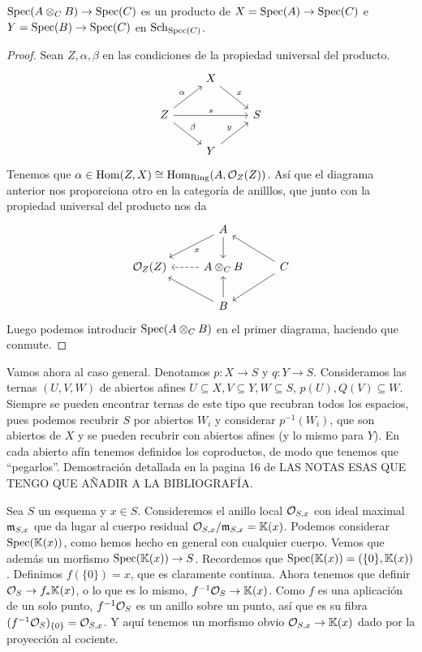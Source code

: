 \documentclass[GA.tex]{subfiles}
\begin{document}
\begin{dem}
\begin{lemma}
$\operatorname{Spec}(A\otimes_C B)\to\operatorname{Spec}(C)$ es un producto de $X=\operatorname{Spec}(A)\to\operatorname{Spec}(C)$ e $Y=\operatorname{Spec}(B)\to\operatorname{Spec}(C)$ en $\mathrm{Sch}_{\operatorname{Spec}(C)}$.
\end{lemma}
\begin{proof}
Sean $Z,\alpha,\beta$ en las condiciones de la propiedad universal del producto. 
\[
\begin{tikzcd}
& X\arrow[dr, "x"]&\\
Z\arrow[ur, "\alpha"]\arrow[rr, "s"]\arrow[dr, "\beta"] &  & S\\
& Y \arrow[ur, "y"]&
\end{tikzcd}
\]
Tenemos que $\alpha\in\operatorname{Hom}(Z,X)\cong\operatorname{Hom}_{\mathrm{Ring}}(A,{\mathcal O}_Z(Z))$. Así que el diagrama anterior nos proporciona otro en la categoría de anilllos, que junto con la propiedad universal del producto nos da
\[
\begin{tikzcd}
& A\arrow[dl, "x"]\arrow[d]&\\
\OO_Z(Z) & A\otimes_C B\arrow[l, dashed] & C\arrow[dl]\arrow[ul]\\
& B \arrow[ul]\arrow[u]&
\end{tikzcd}
\]
Luego podemos introducir $\operatorname{Spec}(A\otimes_C B)$ en el primer diagrama, haciendo que conmute. 

\end{proof}

Vamos ahora al caso general. Denotamos $p:X\to S$ y $q:Y\to S$. Consideramos las ternas $(U,V,W)$ de abiertos afines $U\subseteq X, V\subseteq Y, W\subseteq S$, $p(U),Q(V)\subseteq W$. Siempre se pueden encontrar ternas de este tipo que recubran todos los espacios, pues podemos recubrir $S$ por abiertos $W_i$ y considerar $p^{-1}(W_i)$, que son abiertos de $X$ y se pueden recubrir con abiertos afines (y lo mismo para $Y$). En cada abierto afín tenemos definidos los coproductos, de modo que tenemos que ``pegarlos''. Demostración detallada en la pagina 16 de LAS NOTAS ESAS QUE TENGO QUE AÑADIR A LA BIBLIOGRAFÍA. 
\end{dem}

Sea $S$ un esquema y $x\in S$. Consideremos el anillo local ${\mathcal O}_{S,x}$ con ideal maximal ${\mathfrak{m}}_{S,x}$ que da lugar al cuerpo residual ${\mathcal O}_{S,x}/{\mathfrak{m}}_{S,x}=\mathbb{K}(x)$. Podemos considerar $\operatorname{Spec}(\mathbb{K}(x))$, como hemos hecho en general con cualquier cuerpo. Vemos que además un morfismo $\operatorname{Spec}(\mathbb{K}(x))\to S$. Recordemos que $\operatorname{Spec}(\mathbb{K}(x))=(\{0\},\mathbb{K}(x))$. Definimos $f(\{0\})=x$, que es claramente continua. Ahora tenemos que definir ${\mathcal O}_S\to f_*\mathbb{K}(x)$, o lo que es lo mismo, $f^{-1}{\mathcal O}_S\to \mathbb{K}(x)$. Como $f$ es una aplicación de un solo punto, $f^{-1}{\mathcal O}_S$ es un anillo sobre un punto, así que es su fibra $(f^{-1}{\mathcal O}_S)_{\{0\}}={\mathcal O}_{S,x}$. Y aquí tenemos un morfismo obvio ${\mathcal O}_{S,x}\to \mathbb{K}(x)$ dado por la proyección al cociente. 
\end{document}
